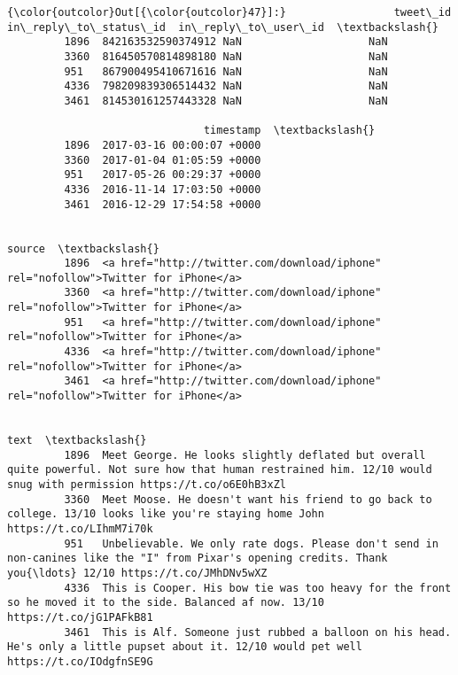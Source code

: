 \documentclass[11pt]{article}
\begin{document}
\begin{Verbatim}[commandchars=\\\{\}]
{\color{outcolor}Out[{\color{outcolor}47}]:}                 tweet\_id  in\_reply\_to\_status\_id  in\_reply\_to\_user\_id  \textbackslash{}
         1896  842163532590374912 NaN                    NaN                    
         3360  816450570814898180 NaN                    NaN                    
         951   867900495410671616 NaN                    NaN                    
         4336  798209839306514432 NaN                    NaN                    
         3461  814530161257443328 NaN                    NaN                    
         
                               timestamp  \textbackslash{}
         1896  2017-03-16 00:00:07 +0000   
         3360  2017-01-04 01:05:59 +0000   
         951   2017-05-26 00:29:37 +0000   
         4336  2016-11-14 17:03:50 +0000   
         3461  2016-12-29 17:54:58 +0000   
         
                                                                                           source  \textbackslash{}
         1896  <a href="http://twitter.com/download/iphone" rel="nofollow">Twitter for iPhone</a>   
         3360  <a href="http://twitter.com/download/iphone" rel="nofollow">Twitter for iPhone</a>   
         951   <a href="http://twitter.com/download/iphone" rel="nofollow">Twitter for iPhone</a>   
         4336  <a href="http://twitter.com/download/iphone" rel="nofollow">Twitter for iPhone</a>   
         3461  <a href="http://twitter.com/download/iphone" rel="nofollow">Twitter for iPhone</a>   
         
                                                                                                                                                                               text  \textbackslash{}
         1896  Meet George. He looks slightly deflated but overall quite powerful. Not sure how that human restrained him. 12/10 would snug with permission https://t.co/o6E0hB3xZl   
         3360  Meet Moose. He doesn't want his friend to go back to college. 13/10 looks like you're staying home John https://t.co/LIhmM7i70k                                        
         951   Unbelievable. We only rate dogs. Please don't send in non-canines like the "I" from Pixar's opening credits. Thank you{\ldots} 12/10 https://t.co/JMhDNv5wXZ                
         4336  This is Cooper. His bow tie was too heavy for the front so he moved it to the side. Balanced af now. 13/10 https://t.co/jG1PAFkB81                                     
         3461  This is Alf. Someone just rubbed a balloon on his head. He's only a little pupset about it. 12/10 would pet well https://t.co/IOdgfnSE9G                               
         

\end{Verbatim}
\end{document}
